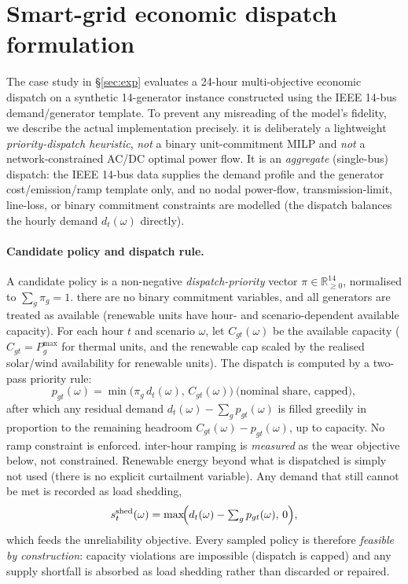 \section{Smart-grid economic dispatch formulation}
\label{app:smartgrid}
The case study in \S\ref{sec:exp} evaluates a 24-hour multi-objective economic dispatch on a synthetic 14-generator instance constructed using the IEEE 14-bus demand/generator template. To prevent any misreading of the model's fidelity, we describe the actual implementation precisely. it is deliberately a lightweight \emph{priority-dispatch heuristic}, \emph{not} a binary unit-commitment MILP and \emph{not} a network-constrained AC/DC optimal power flow. It is an \emph{aggregate} (single-bus) dispatch: the IEEE 14-bus data supplies the demand profile and the generator cost/emission/ramp template only, and no nodal power-flow, transmission-limit, line-loss, or binary commitment constraints are modelled (the dispatch balances the hourly demand $d_t(\omega)$ directly).

\paragraph{Candidate policy and dispatch rule.}
A candidate policy is a non-negative \emph{dispatch-priority} vector $\pi\in\mathbb{R}^{14}_{\ge 0}$, normalised to $\sum_g\pi_g=1$. there are no binary commitment variables, and all generators are treated as available (renewable units have hour- and scenario-dependent available capacity). For each hour $t$ and scenario $\omega$, let $C_{gt}(\omega)$ be the available capacity ($C_{gt}=P_g^{\max}$ for thermal units, and the renewable cap scaled by the realised solar/wind availability for renewable units). The dispatch is computed by a two-pass priority rule:
\begin{equation}
p_{gt}(\omega)=\min\!\bigl(\pi_g\,d_t(\omega),\,C_{gt}(\omega)\bigr)\ \text{(nominal share, capped)},
\end{equation}
after which any residual demand $d_t(\omega)-\sum_g p_{gt}(\omega)$ is filled greedily in proportion to the remaining headroom $C_{gt}(\omega)-p_{gt}(\omega)$, up to capacity. No ramp constraint is enforced. inter-hour ramping is \emph{measured} as the wear objective below, not constrained. Renewable energy beyond what is dispatched is simply not used (there is no explicit curtailment variable). Any demand that still cannot be met is recorded as load shedding,
\begin{equation}
s_t^{\mathrm{shed}}(\omega)=\max\!\Bigl(d_t(\omega)-\textstyle\sum_g p_{gt}(\omega),\,0\Bigr),
\end{equation}
which feeds the unreliability objective. Every sampled policy is therefore \emph{feasible by construction}: capacity violations are impossible (dispatch is capped) and any supply shortfall is absorbed as load shedding rather than discarded or repaired.

